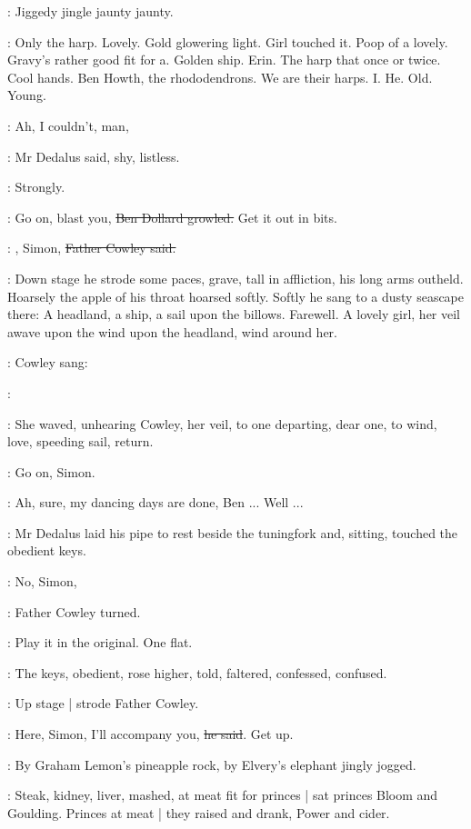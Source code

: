 :
Jiggedy jingle jaunty jaunty.

\BloomInt:
Only the harp.
Lovely.
Gold glowering light.
Girl touched it.
Poop of a lovely.
Gravy's rather good fit for a.
Golden ship.
Erin.
The harp that
once or twice.
Cool hands.
Ben Howth,
the rhododendrons.
We are their harps.
I.
He.
Old.
Young.

\simon:
Ah,
I couldn't,
man,

:
Mr Dedalus said,
shy,
listless.

:
Strongly.

\dollard:
Go on,
blast you,
\sout{Ben Dollard growled.}
Get it out in bits.

\cowley:
,
Simon,
\sout{Father Cowley said.}

:
Down stage he strode some paces,
grave,
tall in affliction,
his long arms outheld.
Hoarsely the apple of his throat hoarsed softly.
Softly
he sang to a dusty seascape there:
A headland,
a ship,
a sail upon the billows.
Farewell.
A lovely girl,
her veil awave upon the wind
upon the headland,
wind around her.

:
Cowley sang:

\cowley:

:
She waved,
unhearing Cowley,
her veil,
to one departing,
dear one,
to wind,
love,
speeding sail,
return.

\dollard:
Go on,
Simon.

\simon:
Ah,
sure,
my dancing days are done,
Ben ...
Well ...

:
Mr Dedalus laid his pipe to rest beside the tuningfork
and,
sitting,
touched the obedient keys.

\cowley:
No,
Simon,

:
Father Cowley turned.

\cowley:
Play it in the original.
One flat.

:
The keys,
obedient,
rose higher,
told,
faltered,
confessed,
confused.

:
Up stage |
strode Father Cowley.

\cowley:
Here,
Simon,
I'll accompany you,
\sout{he said}.
Get up.

:
By Graham Lemon's pineapple rock,
by Elvery's elephant
jingly jogged.

:
Steak,
kidney,
liver,
mashed,
at meat fit for princes |
sat princes Bloom and Goulding.
Princes at meat |
they raised and drank,
Power and cider.

